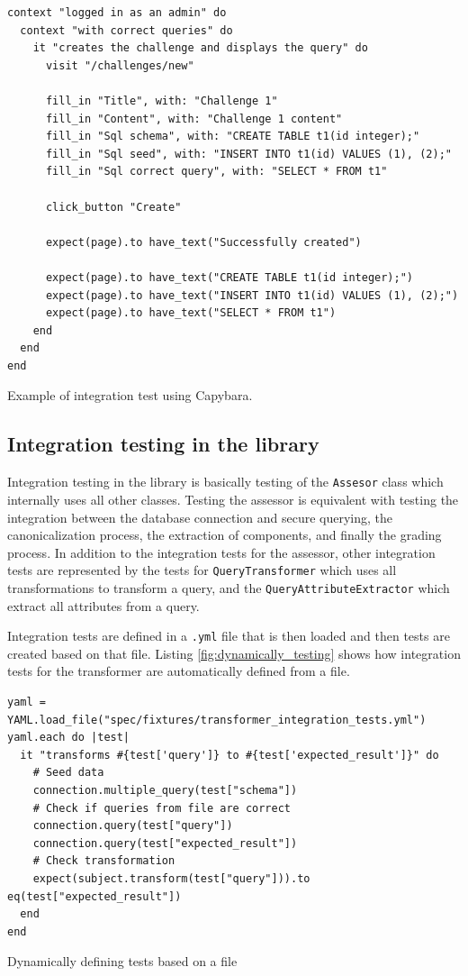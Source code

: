 \begin{code}
\begin{verbatim}
context "logged in as an admin" do
  context "with correct queries" do
    it "creates the challenge and displays the query" do
      visit "/challenges/new"

      fill_in "Title", with: "Challenge 1"
      fill_in "Content", with: "Challenge 1 content"
      fill_in "Sql schema", with: "CREATE TABLE t1(id integer);"
      fill_in "Sql seed", with: "INSERT INTO t1(id) VALUES (1), (2);"
      fill_in "Sql correct query", with: "SELECT * FROM t1"

      click_button "Create"

      expect(page).to have_text("Successfully created")

      expect(page).to have_text("CREATE TABLE t1(id integer);")
      expect(page).to have_text("INSERT INTO t1(id) VALUES (1), (2);")
      expect(page).to have_text("SELECT * FROM t1")
    end
  end
end
\end{verbatim}
\caption{Example of integration test using Capybara.}
\end{code}

\subsection{Integration testing in the library} \label{ch:impl:sec:testing:subsec:integ_library}

Integration testing in the library is basically testing of the \texttt{Assesor} class which internally uses all other classes. Testing the assessor is equivalent with testing the integration between the database connection and secure querying, the canonicalization process, the extraction of components, and finally the grading process. In addition to the integration tests for the assessor, other integration tests are represented by the tests for \texttt{QueryTransformer} which uses all transformations to transform a query, and the \texttt{QueryAttributeExtractor} which extract all attributes from a query.

Integration tests are defined in a \texttt{.yml} file that is then loaded and then tests are created based on that file. Listing \ref{fig:dynamically_testing} shows how integration tests for the transformer are automatically defined from a file.

\begin{code}
\begin{verbatim}
yaml = YAML.load_file("spec/fixtures/transformer_integration_tests.yml")
yaml.each do |test|
  it "transforms #{test['query']} to #{test['expected_result']}" do
    # Seed data
    connection.multiple_query(test["schema"])
    # Check if queries from file are correct
    connection.query(test["query"])
    connection.query(test["expected_result"])
    # Check transformation
    expect(subject.transform(test["query"])).to eq(test["expected_result"])
  end
end
\end{verbatim}
\caption{Dynamically defining tests based on a file}
\label{fig:dynamically_testing}
\end{code}